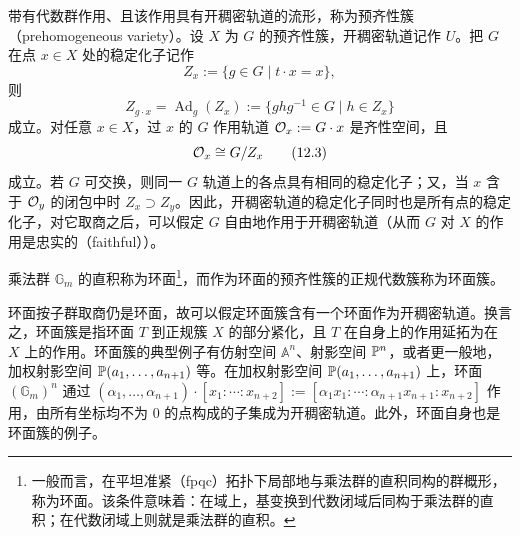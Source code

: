 带有代数群作用、且该作用具有开稠密轨道的流形，称为预齐性簇（prehomogeneous variety）。设 $X$ 为 $G$ 的预齐性簇，开稠密轨道记作 $U$。把 $G$ 在点 $x\in X$ 处的稳定化子记作
\begin{equation}
    Z_x := \{g\in G\mid t\cdot x = x\}, \tag{12.1}
\end{equation}
则
\begin{equation}
    Z_{g\cdot x} = \operatorname{Ad}_g(Z_x) := \{ghg^{-1}\in G\mid h\in Z_x\} \tag{12.2}
\end{equation}
成立。对任意 $x\in X$，过 $x$ 的 $G$ 作用轨道 $\mathcal{O}_x := G\cdot x$ 是齐性空间，且
\begin{equation}
    \mathcal{O}_x \cong G/Z_x \tag{12.3}
\end{equation}
成立。若 $G$ 可交换，则同一 $G$ 轨道上的各点具有相同的稳定化子；又，当 $x$ 含于 $\mathcal{O}_y$ 的闭包中时 $Z_x\supset Z_y$。因此，开稠密轨道的稳定化子同时也是所有点的稳定化子，对它取商之后，可以假定 $G$ 自由地作用于开稠密轨道（从而 $G$ 对 $X$ 的作用是忠实的（faithful））。


乘法群 $\mathbb{G}_m$ 的直积称为环面\footnote{一般而言，在平坦准紧（fpqc）拓扑下局部地与乘法群的直积同构的群概形，称为环面。该条件意味着：在域上，基变换到代数闭域后同构于乘法群的直积；在代数闭域上则就是乘法群的直积。}，而作为环面的预齐性簇的正规代数簇称为环面簇。

环面按子群取商仍是环面，故可以假定环面簇含有一个环面作为开稠密轨道。换言之，环面簇是指环面 $T$ 到正规簇 $X$ 的部分紧化，且 $T$ 在自身上的作用延拓为在 $X$ 上的作用。环面簇的典型例子有仿射空间 $\mathbb{A}^n$、射影空间 $\mathbb{P}^n$，或者更一般地，加权射影空间 $\mathbb{P}(a_1,\dots,a_{n+1})$ 等。在加权射影空间 $\mathbb{P}(a_1,\dots,a_{n+1})$ 上，环面 $(\mathbb{G}_m)^n$ 通过 $(\alpha_1,\dots,\alpha_{n+1})\cdot[x_1:\cdots:x_{n+2}] := [\alpha_1x_1:\cdots:\alpha_{n+1}x_{n+1}:x_{n+2}]$ 作用，由所有坐标均不为 $0$ 的点构成的子集成为开稠密轨道。此外，环面自身也是环面簇的例子。


